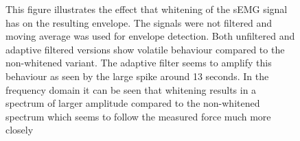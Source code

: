 \begin{figure}[h!t]
	\begin{center}
	\noindent{}
	\end{center}
	\caption{This figure illustrates the effect that whitening of the sEMG signal has on the resulting envelope. The signals were not filtered and moving average was used for envelope detection. Both unfiltered and adaptive filtered versions show volatile behaviour compared to the non-whitened variant. The adaptive filter seems to amplify this behaviour as seen by the large spike around 13 seconds. In the frequency domain it can be seen that whitening results in a spectrum of larger amplitude compared to the non-whitened spectrum which seems to follow the measured force much more closely}
	\label{fig:result_prewhitening}
\end{figure}


